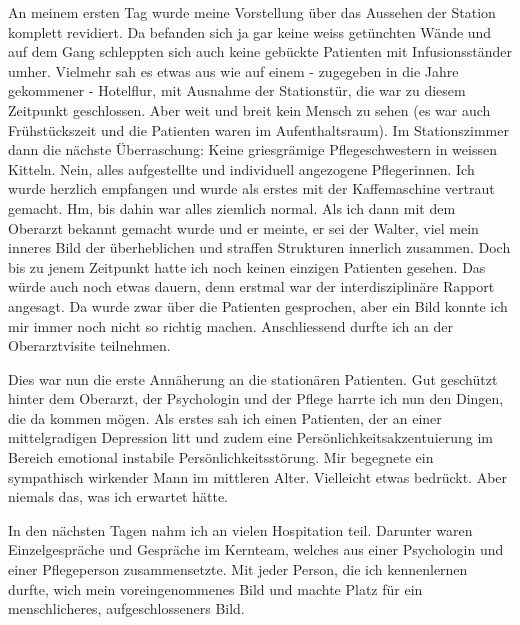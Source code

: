 An meinem ersten Tag wurde meine Vorstellung über das Aussehen der Station komplett revidiert. Da befanden sich ja gar keine weiss getünchten Wände und auf dem Gang schleppten sich auch keine gebückte Patienten mit Infusionsständer umher. Vielmehr sah es etwas aus wie auf einem - zugegeben in die Jahre gekommener - Hotelflur, mit Ausnahme der Stationstür, die war zu diesem Zeitpunkt geschlossen. Aber weit und breit kein Mensch zu sehen (es war auch Frühstückszeit und die Patienten waren im Aufenthaltsraum). Im Stationszimmer dann die nächste Überraschung: Keine griesgrämige Pflegeschwestern in weissen Kitteln. Nein, alles aufgestellte und individuell angezogene Pflegerinnen. Ich wurde herzlich empfangen und wurde als erstes mit der Kaffemaschine vertraut gemacht. Hm, bis dahin war alles ziemlich normal. Als ich dann mit dem Oberarzt bekannt gemacht wurde und er meinte, er sei der Walter, viel mein inneres Bild der überheblichen und straffen Strukturen innerlich zusammen. Doch bis zu jenem Zeitpunkt hatte ich noch keinen einzigen Patienten gesehen. Das würde auch noch etwas dauern, denn erstmal war der interdisziplinäre Rapport angesagt. Da wurde zwar über die Patienten gesprochen, aber ein Bild konnte ich mir immer noch nicht so richtig machen. Anschliessend durfte ich an der Oberarztvisite teilnehmen. 

Dies war nun die erste Annäherung an die stationären Patienten. Gut geschützt hinter dem Oberarzt, der Psychologin und der Pflege harrte ich nun den Dingen, die da kommen mögen. Als erstes sah ich einen Patienten, der an einer mittelgradigen Depression litt und zudem eine Persönlichkeitsakzentuierung im Bereich emotional instabile Persönlichkeitsstörung. Mir begegnete ein sympathisch wirkender Mann im mittleren Alter. Vielleicht etwas bedrückt. Aber niemals das, was ich erwartet hätte.  

In den nächsten Tagen nahm ich an vielen Hospitation teil. Darunter waren Einzelgespräche und Gespräche im Kernteam, welches aus einer Psychologin und einer Pflegeperson zusammensetzte. Mit jeder Person, die ich kennenlernen durfte, wich mein voreingenommenes Bild und machte Platz für ein menschlicheres, aufgeschlosseners Bild. 

